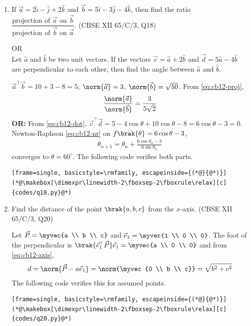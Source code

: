 \begin{enumerate}[label=\thesubsection.\arabic*, ref=\thesubsection.\theenumi,itemsep=0pt]
\item If $\vec{a} = 2\hat{i} - \hat{j} + 2\hat{k}$ and $\vec{b} = 5\hat{i} - 3\hat{j} - 4\hat{k}$, then find the ratio $\dfrac{\text{projection of } \vec{a} \text{ on } \vec{b}}{\text{projection of } \vec{b} \text{ on } \vec{a}}$.
\hfill (CBSE XII 65/C/3, Q18)

\hfill OR \\
Let $\hat{a}$ and $\hat{b}$ be two unit vectors. If the vectors $\vec{c} = \hat{a} + 2\hat{b}$ and $\vec{d} = 5\hat{a} - 4\hat{b}$ are perpendicular to each other, then find the angle between $\hat{a}$ and $\hat{b}$.

\solution $\vec{a}^{\top}\vec{b} = 10 + 3 - 8 = 5$, $\norm{\vec{a}} = 3$, $\norm{\vec{b}} = \sqrt{50}$. From \eqref{eq:cb12-proj},
\begin{align}
\frac{\norm{\vec{a}}}{\norm{\vec{b}}} = \frac{3}{5\sqrt{2}}
\end{align}
\textbf{OR:} From \eqref{eq:cb12-dot}, $\vec{c}^{\top}\vec{d} = 5 - 4\cos\theta + 10\cos\theta - 8 = 6\cos\theta - 3 = 0$. Newton-Raphson \eqref{eq:cb12-nr} on $f\brak{\theta} = 6\cos\theta - 3$,
\begin{align}
\theta_{n+1} = \theta_n + \frac{6\cos\theta_n - 3}{6\sin\theta_n}
\end{align}
converges to $\theta = 60^\circ$. The following code verifies both parts.
\begin{lstlisting}[frame=single, basicstyle=\rmfamily, escapeinside={(*@}{@*)}]
(*@\makebox[\dimexpr\linewidth-2\fboxsep-2\fboxrule\relax][c]{codes/q18.py}@*)
\end{lstlisting}

\item Find the distance of the point $\brak{a,b,c}$ from the $x$-axis.
\hfill (CBSE XII 65/C/3, Q20)

\solution Let $\vec{P} = \myvec{a \\ b \\ c}$ and $\vec{e}_1 = \myvec{1 \\ 0 \\ 0}$. The foot of the perpendicular is $\brak{\vec{e}_1^{\top}\vec{P}}\vec{e}_1 = \myvec{a \\ 0 \\ 0}$ and from \ref{eq:cb12-axis},
\begin{align}
d = \norm{\vec{P} - a\vec{e}_1} = \norm{\myvec{0 \\ b \\ c}} = \sqrt{b^2 + c^2}
\end{align}
The following code verifies this for assumed points.
\begin{lstlisting}[frame=single, basicstyle=\rmfamily, escapeinside={(*@}{@*)}]
(*@\makebox[\dimexpr\linewidth-2\fboxsep-2\fboxrule\relax][c]{codes/q20.py}@*)
\end{lstlisting}


\end{enumerate}
